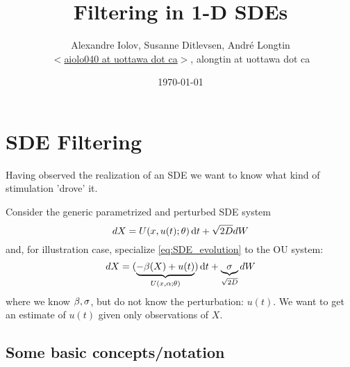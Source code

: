 \documentclass{article}
\begin{document}
\title{Filtering in 1-D SDEs}
 \author{Alexandre Iolov, Susanne
Ditlevsen, Andr\'e Longtin  \\ $<$\href{mailto:aiolo040@uottawa.ca}
		{aiolo040 at uottawa dot ca}$>$, alongtin at uottawa dot ca}

\date{\today}

\maketitle


\tableofcontents

\section{SDE Filtering}
Having observed the realization of an SDE we want to know what kind of
stimulation 'drove' it. 

Consider the generic parametrized and perturbed SDE system 
\begin{equation}
dX = U(x, u(t); {\theta}) \, \mathrm{d} t + \sqrt{2D} dW
\label{eq:SDE_evolution} 
\end{equation}
and, for illustration case, specialize \cref{eq:SDE_evolution} to the OU
system:
\begin{equation}
dX = (\underbrace{-{\beta}(X) + u(t)}_{U(x,{\alpha}; {\theta})}) \, \mathrm{d} t +
\underbrace{{\sigma }}_{\sqrt{2D}} dW
\label{eq:OU_evolution} 
\end{equation}
where we know ${\beta}, {\sigma }$, but do not know the perturbation: $u(t)$. We want to get
an estimate of $u(t)$ given only observations of $X$.  


\subsection{Some basic concepts/notation}
% 
\end{document}

